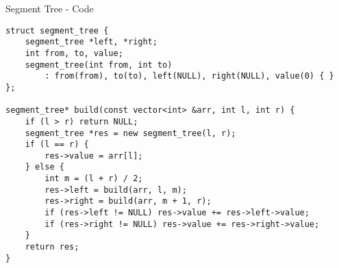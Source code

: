 \documentclass[12pt,t]{beamer}
\begin{document}
\begin{frame}[fragile]{Segment Tree - Code}
    \begin{verbatim}
struct segment_tree {
    segment_tree *left, *right;
    int from, to, value;
    segment_tree(int from, int to)
        : from(from), to(to), left(NULL), right(NULL), value(0) { }
};

segment_tree* build(const vector<int> &arr, int l, int r) {
    if (l > r) return NULL;
    segment_tree *res = new segment_tree(l, r);
    if (l == r) {
        res->value = arr[l];
    } else {
        int m = (l + r) / 2;
        res->left = build(arr, l, m);
        res->right = build(arr, m + 1, r);
        if (res->left != NULL) res->value += res->left->value;
        if (res->right != NULL) res->value += res->right->value;
    }
    return res;
}
    \end{verbatim}
\end{frame}
\end{document}
